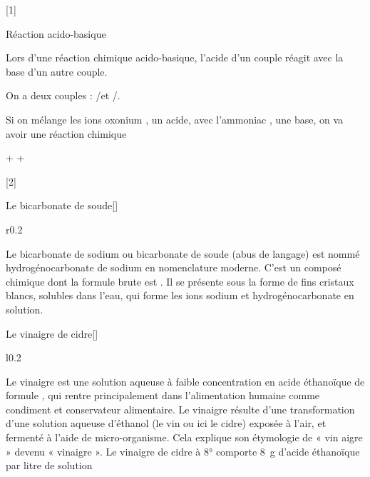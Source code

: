 [1]

\begin{doc}{Réaction acido-basique}
  \begin{importants}  
    Lors d'une réaction chimique acido-basique, l'acide d'un couple réagit avec la base d'un autre couple.
  \end{importants}
  
  \exemple On a deux couples : \oxonium/\eau et \ammonium/\ammoniac.

  Si on mélange les ions oxonium , un acide, avec l'ammoniac \ammoniac, une base, on va avoir une réaction chimique
  \vspace*{-12pt}
  \begin{center}
    \oxonium + \ammoniac \reaction \eau + \ammonium
  \end{center}
\end{doc}

[2]

\newpage
\vspace*{-40pt}

\begin{doc}{Le bicarbonate de soude}[\label{doc:bicarbonate}]
  \begin{wrapfigure}{r}{0.2\linewidth}
    \vspace*{-38pt}
    \centering
  \end{wrapfigure}
  Le bicarbonate de sodium ou bicarbonate de soude (abus de langage) est nommé hydrogénocarbonate de sodium en nomenclature moderne.
  C’est un composé chimique dont la formule brute est \bicarbonateDeSodium.
  Il se présente sous la forme de fins cristaux blancs, solubles dans l’eau, qui forme les ions sodium \ionSodium et hydrogénocarbonate \bicarbonate en solution.
\end{doc}

\begin{doc}{Le vinaigre de cidre}[\label{doc:vinaigre}]
  \begin{wrapfigure}{l}{0.2\linewidth}
    \vspace*{-22pt}
    \centering
  \end{wrapfigure}
  Le vinaigre est une solution aqueuse à faible concentration en acide éthanoïque de
  formule , qui rentre principalement dans l'alimentation humaine comme condiment et conservateur alimentaire. 
  Le vinaigre résulte d'une transformation d'une solution aqueuse d'éthanol (le vin ou ici le cidre) exposée à l'air, et fermenté à l’aide de micro-organisme.
  Cela explique son étymologie de « vin aigre » devenu « vinaigre ».
  Le vinaigre de cidre à 8° comporte \qty{8}{\g} d’acide éthanoïque par litre de solution
\end{doc}

